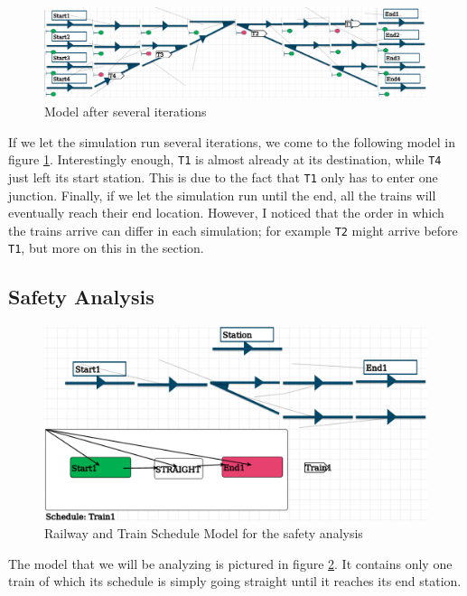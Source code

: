 \documentclass{article}
\begin{document}
\begin{figure}[H]
    \centering
    \includegraphics[width=\textwidth]{images/example_devs_after_few_iters.png}
    \caption{Model after several iterations}
    \label{example_devs_after_few_iters}
\end{figure}

If we let the simulation run several iterations, we come to the following model in figure \ref{example_devs_after_few_iters}. Interestingly enough, \texttt{T1} is almost already at its destination, while \texttt{T4} just left its start station. This is due to the fact that \texttt{T1} only has to enter one junction. Finally, if we let the simulation run until the end, all the trains will eventually reach their end location. However, I noticed that the order in which the trains arrive can differ in each simulation; for example \texttt{T2} might arrive before \texttt{T1}, but more on this in the  section.

\subsection*{Safety Analysis}

\begin{figure}[H]
    \centering
    \includegraphics[width=\textwidth]{images/example_pn.png}
    \caption{Railway and Train Schedule Model for the safety analysis}
    \label{example_pn}
\end{figure}

The model that we will be analyzing is pictured in figure \ref{example_pn}. It contains only one train of which its schedule is simply going straight until it reaches its end station.
\end{document}
